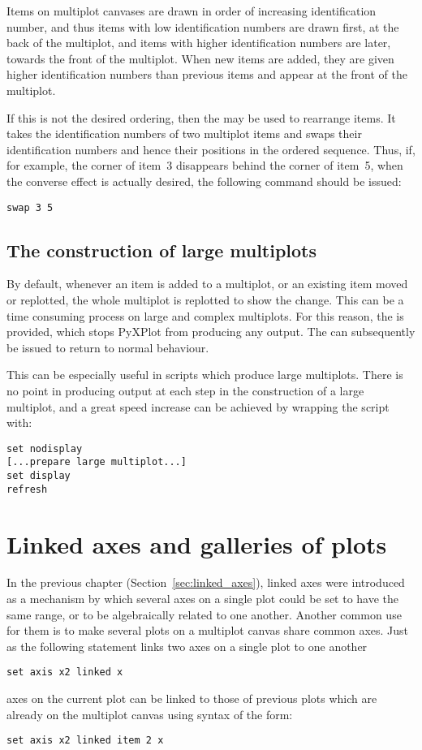 Items on multiplot canvases are drawn in order of increasing identification
number, and thus items with low identification numbers are drawn first, at the
back of the multiplot, and items with higher identification numbers are later,
towards the front of the multiplot. When new items are added, they are given
higher identification numbers than previous items and appear at the front of
the multiplot.

If this is not the desired ordering, then the  may be used to
rearrange items. It takes the identification numbers of two multiplot items and
swaps their identification numbers and hence their positions in the ordered
sequence.  Thus, if, for example, the corner of item~3 disappears behind the
corner of item~5, when the converse effect is actually desired, the following
command should be issued:
\begin{verbatim}
swap 3 5
\end{verbatim}

\subsection{The construction of large multiplots}
\label{sec:set_display}

By default, whenever an item is added to a multiplot, or an existing item moved
or replotted, the whole multiplot is replotted to show the change. This can be
a time consuming process on large and complex multiplots. For this reason, the
 is provided, which stops PyXPlot from producing any
output. The  can subsequently be issued to return to
normal behaviour.

This can be especially useful in scripts which produce large multiplots. There
is no point in producing output at each step in the construction of a large
multiplot, and a great speed increase can be achieved by wrapping the script
with:

\begin{verbatim}
set nodisplay
[...prepare large multiplot...]
set display
refresh
\end{verbatim}

\section{Linked axes and galleries of plots}

In the previous chapter (Section~\ref{sec:linked_axes}), linked axes were
introduced as a mechanism by which several axes on a single plot could be set
to have the same range, or to be algebraically related to one another. Another
common use for them is to make several plots on a multiplot canvas share common
axes. Just as the following statement links two axes on a single plot to one
another
\begin{verbatim}
set axis x2 linked x
\end{verbatim}
axes on the current plot can be linked to those of previous plots which are
already on the multiplot canvas using syntax of the form:
\begin{verbatim}
set axis x2 linked item 2 x
\end{verbatim}

